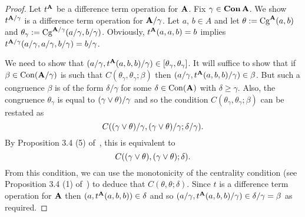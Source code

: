 \begin{proof}
  Let $t^{\mathbf{A}}$ be a difference term operation for $\mathbf{A}$.  Fix $\gamma \in \operatorname{\mathbf{Con}} \mathbf{A}$.
We show $t^{\mathbf{A}/\gamma}$ is a difference term operation for $\mathbf{A}/\gamma$.  Let $a$, $b \in A$ and let $\theta:= \operatorname{Cg}^{\mathbf{A}}(a,b)$ and $\theta_\gamma := \operatorname{Cg}^{\mathbf{A}/\gamma}(a/\gamma, b/\gamma)$.
Obviously, $t^{\mathbf{A}}(a,a,b) = b$  implies
$t^{\mathbf{A}/\gamma}(a/\gamma, a/\gamma, b/\gamma) = b/\gamma$.

We need to show that $(a/\gamma, t^{\mathbf{A}}(a,b,b)/\gamma) \in [\theta_\gamma, \theta_\gamma]$.  It will suffice to show that if $\beta \in \operatorname{Con}(\mathbf{A}/\gamma)$  is such that $C(\theta_\gamma, \theta_\gamma; \beta)$ then $(a/\gamma, t^{\mathbf{A}}(a,b,b)/\gamma) \in \beta$.  But such a congruence $\beta$ is of the form $\delta/\gamma$ for some $\delta \in \operatorname{Con}(\mathbf{A})$ with $\delta \ge \gamma$. Also, the congruence $\theta_\gamma$ is equal to $(\gamma \join \theta)/\gamma$ and so the condition $C(\theta_\gamma, \theta_\gamma; \beta)$ can be restated as 
\[
C((\gamma \join \theta)/\gamma, (\gamma \join \theta)/\gamma; \delta/\gamma).
\]
By Proposition 3.4 (5) of~\cite{HM:1988}, this is equivalent to
\[
C((\gamma \join \theta), (\gamma \join \theta); \delta).
\]
From this condition, we can use the monotonicity of the centrality condition (see Proposition 3.4 (1) of~\cite{HM:1988}) to deduce that $C(\theta, \theta; \delta)$. Since $t$ is a difference term operation for $\mathbf{A}$ then $(a, t^{\mathbf{A}}(a,b,b)) \in \delta$ and so $(a/\gamma, t^{\mathbf{A}}(a,b,b)/\gamma) \in  \delta/\gamma = \beta$ as required.
\end{proof}
%
%
%
